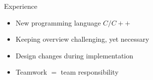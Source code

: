 \begin{frame}{Experience}
	\begin{itemize}
		\pause
		\item New programming language $C/C++$
		\pause
		\item Keeping overview challenging, yet necessary 
		\pause
		\item Design changes during implementation
		\pause		
		\item Teamwork $=$ team responsibility
	\end{itemize}
\end{frame}
